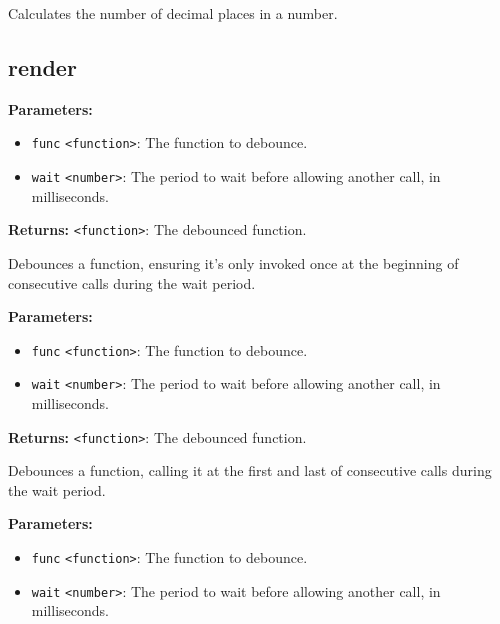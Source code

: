 \documentclass[12pt,a4paper]{article}
\begin{document}
\noindent Calculates the number of decimal places in a number.


\subsection{render}
\vspace{5mm}
\noindent {}


\noindent \textbf{Parameters:}
\begin{itemize}
  \item \texttt{func} \texttt{<function>}: The function to debounce.
  \item \texttt{wait} \texttt{<number>}: The period to wait before allowing another call, in milliseconds.
\end{itemize}

\noindent \textbf{Returns:} \texttt{<function>}: The debounced function.

\noindent Debounces a function, ensuring it's only invoked once at the beginning of consecutive calls during the wait period.

\vspace{5mm}
\noindent {}


\noindent \textbf{Parameters:}
\begin{itemize}
  \item \texttt{func} \texttt{<function>}: The function to debounce.
  \item \texttt{wait} \texttt{<number>}: The period to wait before allowing another call, in milliseconds.
\end{itemize}

\noindent \textbf{Returns:} \texttt{<function>}: The debounced function.

\noindent Debounces a function, calling it at the first and last of consecutive calls during the wait period.

\vspace{5mm}
\noindent {}


\noindent \textbf{Parameters:}
\begin{itemize}
  \item \texttt{func} \texttt{<function>}: The function to debounce.
  \item \texttt{wait} \texttt{<number>}: The period to wait before allowing another call, in milliseconds.
\end{itemize}
\end{document}
